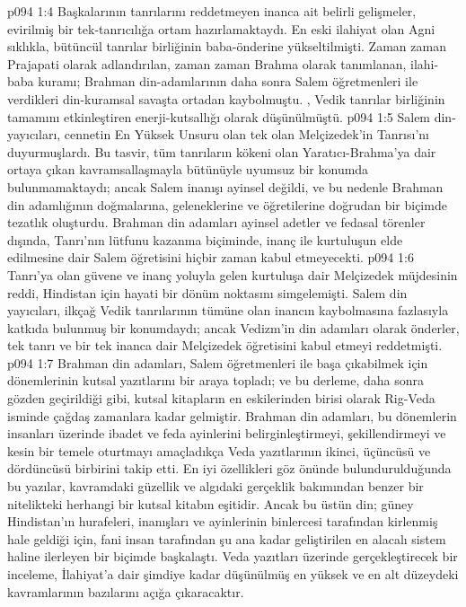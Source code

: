 \vs p094 1:4 Başkalarının tanrılarını reddetmeyen inanca ait belirli gelişmeler, evirilmiş bir tek\hyp{}tanrıcılığa ortam hazırlamaktaydı. En eski ilahiyat olan Agni sıklıkla, bütüncül tanrılar birliğinin baba\hyp{}önderine yükseltilmişti. Zaman zaman Prajapati olarak adlandırılan, zaman zaman Brahma olarak tanımlanan, ilahi\hyp{}baba kuramı; Brahman din\hyp{}adamlarının daha sonra Salem öğretmenleri ile verdikleri din\hyp{}kuramsal savaşta ortadan kaybolmuştu. , Vedik tanrılar birliğinin tamamını etkinleştiren enerji\hyp{}kutsallığı olarak düşünülmüştü.
\vs p094 1:5 Salem din\hyp{}yayıcıları, cennetin En Yüksek Unsuru olan tek olan Melçizedek’in Tanrısı’nı duyurmuşlardı. Bu tasvir, tüm tanrıların kökeni olan Yaratıcı\hyp{}Brahma’ya dair ortaya çıkan kavramsallaşmayla bütünüyle uyumsuz bir konumda bulunmamaktaydı; ancak Salem inanışı ayinsel değildi, ve bu nedenle Brahman din adamlığının doğmalarına, geleneklerine ve öğretilerine doğrudan bir biçimde tezatlık oluşturdu. Brahman din adamları ayinsel adetler ve fedasal törenler dışında, Tanrı’nın lütfunu kazanma biçiminde, inanç ile kurtuluşun elde edilmesine dair Salem öğretisini hiçbir zaman kabul etmeyecekti.
\vs p094 1:6 Tanrı’ya olan güvene ve inanç yoluyla gelen kurtuluşa dair Melçizedek müjdesinin reddi, Hindistan için hayati bir dönüm noktasını simgelemişti. Salem din yayıcıları, ilkçağ Vedik tanrılarının tümüne olan inancın kaybolmasına fazlasıyla katkıda bulunmuş bir konumdaydı; ancak Vedizm’in din adamları olarak önderler, tek tanrı ve bir tek inanca dair Melçizedek öğretisini kabul etmeyi reddetmişti.
\vs p094 1:7 Brahman din adamları, Salem öğretmenleri ile başa çıkabilmek için dönemlerinin kutsal yazıtlarını bir araya topladı; ve bu derleme, daha sonra gözden geçirildiği gibi, kutsal kitapların en eskilerinden birisi olarak Rig\hyp{}Veda isminde çağdaş zamanlara kadar gelmiştir. Brahman din adamları, bu dönemlerin insanları üzerinde ibadet ve feda ayinlerini belirginleştirmeyi, şekillendirmeyi ve kesin bir temele oturtmayı amaçladıkça Veda yazıtlarının ikinci, üçüncüsü ve dördüncüsü birbirini takip etti. En iyi özellikleri göz önünde bulundurulduğunda bu yazılar, kavramdaki güzellik ve algıdaki gerçeklik bakımından benzer bir nitelikteki herhangi bir kutsal kitabın eşitidir. Ancak bu üstün din; güney Hindistan’ın hurafeleri, inanışları ve ayinlerinin binlercesi tarafından kirlenmiş hale geldiği için, fani insan tarafından şu ana kadar geliştirilen en alacalı sistem haline ilerleyen bir biçimde başkalaştı. Veda yazıtları üzerinde gerçekleştirecek bir inceleme, İlahiyat’a dair şimdiye kadar düşünülmüş en yüksek ve en alt düzeydeki kavramlarının bazılarını açığa çıkaracaktır.
